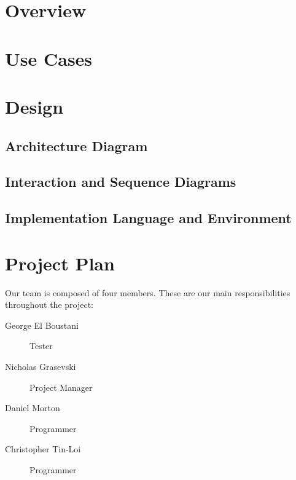 \documentclass{article}
\begin{document}
\maketitle


\section{Overview}


\section{Use Cases}


\section{Design}
\subsection{Architecture Diagram}

\subsection{Interaction and Sequence Diagrams}

\subsection{Implementation Language and Environment}


\section{Project Plan}

Our team is composed of four members. These are our main responsibilities throughout the project:
\begin{description}
  \item[George El Boustani] Tester
  \item[Nicholas Grasevski] Project Manager
  \item[Daniel Morton] Programmer
  \item[Christopher Tin-Loi] Programmer
\end{description}
\end{document}

